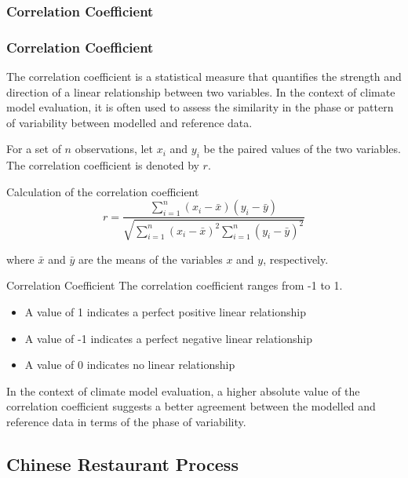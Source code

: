 \documentclass[xcolor={dvipsnames}]{beamer}
\begin{document}
\subsubsection{Correlation Coefficient}

\begin{frame}
\frametitle{Correlation Coefficient}

The correlation coefficient is a statistical measure that quantifies the strength and direction of a linear relationship between two variables. In the context of climate model evaluation, it is often used to assess the similarity in the phase or pattern of variability between modelled and reference data.

\pause

\hfill

For a set of $n$ observations, let $x_i$ and $y_i$ be the paired values of the two variables. The correlation coefficient is denoted by $r$.

\begin{alertblock}{Calculation of the correlation coefficient}
\[
r = \frac{\sum_{i=1}^{n} (x_i - \bar{x})(y_i - \bar{y})}{\sqrt{\sum_{i=1}^{n} (x_i - \bar{x})^2 \sum_{i=1}^{n} (y_i - \bar{y})^2}}
\]
\end{alertblock}

where $\bar{x}$ and $\bar{y}$ are the means of the variables $x$ and $y$, respectively.

\end{frame}

\begin{frame}{Correlation Coefficient}
The correlation coefficient ranges from -1 to 1. 

\begin{itemize}
    \item A value of 1 indicates a perfect positive linear relationship
    \item A value of -1 indicates a perfect negative linear relationship
    \item A value of 0 indicates no linear relationship
\end{itemize}

\hfill

In the context of climate model evaluation, a higher absolute value of the correlation coefficient suggests a better agreement between the modelled and reference data in terms of the phase of variability.

\end{frame}

\subsection{Chinese Restaurant Process}
\end{document}
